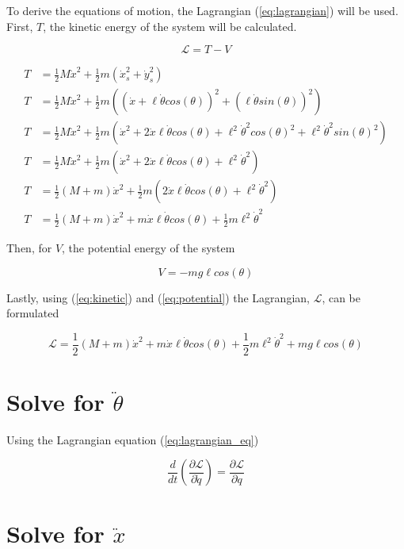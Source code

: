 \documentclass[10pt]{article}
\begin{document}
    To derive the equations of motion, the Lagrangian (\ref{eq:lagrangian}) will be used.
    First, $T$, the kinetic energy of the system will be calculated.

    \begin{equation} \label{eq:lagrangian}
        \mathcal{L} = T - V
    \end{equation}

    \begin{equation}
        \begin{aligned} \label{eq:kinetic}
            T &= \frac{1}{2}  M  \dot x^2 + \frac{1}{2}  m (\dot x_s^2 + \dot y_s^2) \\
            T &= \frac{1}{2}  M  \dot x^2 + \frac{1}{2} m((\dot x + \ell  \dot \theta  cos(\theta))^2 + (\ell  \dot \theta  sin(\theta))^2) \\
            T &= \frac{1}{2}  M  \dot x^2 + \frac{1}{2}  m(\dot x^2 + 2 \dot x  \ell  \dot \theta  cos(\theta) + \ell^2  \dot \theta^2 cos(\theta)^2 + \ell^2  \dot \theta^2  sin(\theta)^2) \\
            T &= \frac{1}{2}  M  \dot x^2 + \frac{1}{2} m(\dot x^2 + 2 \dot x \ell \dot \theta cos(\theta) + \ell^2 \dot \theta^2) \\
            T &= \frac{1}{2}(M + m) \dot x^2 + \frac{1}{2}m(2 \dot x \ell \dot \theta cos(\theta) + \ell^2 \dot \theta^2) \\
            T &= \frac{1}{2}(M + m) \dot x^2 + m \dot x \ell \dot \theta cos(\theta) + \frac{1}{2}m \ell^2 \dot \theta^2 
        \end{aligned}
    \end{equation}

    Then, for $V$, the potential energy of the system

    \begin{equation} \label{eq:potential}
        V = -mg\ell cos(\theta)
    \end{equation}
    
    Lastly, using (\ref{eq:kinetic}) and (\ref{eq:potential}) the 
    Lagrangian, $\mathcal{L}$, can be formulated
    
    \begin{equation} \label{eq:lagrangian_full}
        \mathcal{L} = \frac{1}{2}(M + m) \dot x^2 + m \dot x \ell \dot \theta cos(\theta) + \frac{1}{2}m \ell^2 \dot \theta^2 + mg\ell cos(\theta)
    \end{equation}

    \section{Solve for $\ddot \theta$}
    Using the Lagrangian equation (\ref{eq:lagrangian_eq})

    \begin{equation} \label{eq:lagrangian_eq}
        \frac{d}{dt} \left(\frac{\partial \mathcal{L}}{\partial \dot q} \right) = 
        \frac{\partial \mathcal{L}}{\partial q}
    \end{equation}

    \section{Solve for $\ddot x$}
\end{document}
